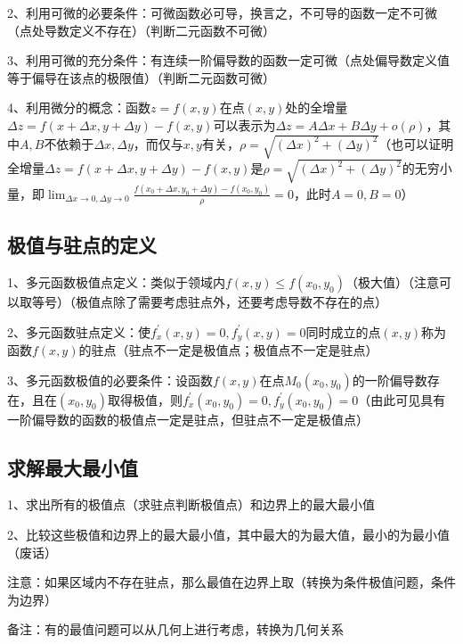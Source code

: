 2、利用可微的必要条件：可微函数必可导，换言之，不可导的函数一定不可微（点处导数定义不存在）（判断二元函数不可微）

3、利用可微的充分条件：有连续一阶偏导数的函数一定可微（点处偏导数定义值等于偏导在该点的极限值）（判断二元函数可微）

4、利用微分的概念：函数$z=f(x, y)$在点$(x, y)$处的全增量$\Delta z=f(x+\Delta x, y+\Delta y)-f(x, y)$可以表示为$\Delta z=A \Delta x+B \Delta y+o(\rho)$，其中$A,B$不依赖于$\Delta x, \Delta y$，而仅与$x, y$有关，$\rho=\sqrt{(\Delta x)^{2}+(\Delta y)^{2}}$（也可以证明全增量$\Delta z=f(x+\Delta x, y+\Delta y)-f(x, y)$是$\rho=\sqrt{(\Delta x)^{2}+(\Delta y)^{2}}$的无穷小量，即$\lim_{\Delta x \rightarrow 0,\Delta y \rightarrow 0}\frac{f\left(x_{0}+\Delta x, y_{0}+\Delta y\right)-f\left(x_{0}, y_{0}\right)}{\rho}=0$，此时$A=0,B=0$）



\subsection{极值与驻点的定义}

1、多元函数极值点定义：类似于领域内$f(x, y) \leqslant f\left(x_{0}, y_{0}\right)$（极大值）（注意可以取等号）（极值点除了需要考虑驻点外，还要考虑导数不存在的点）

2、多元函数驻点定义：使$f_{x}^{\prime}(x, y)=0, f_{y}^{\prime}(x, y)=0$同时成立的点$(x, y)$称为函数$f(x, y)$的驻点（驻点不一定是极值点；极值点不一定是驻点）

3、多元函数极值的必要条件：设函数$f(x, y)$在点$M_{0}\left(x_{0}, y_{0}\right)$的一阶偏导数存在，且在$\left(x_{0}, y_{0}\right)$取得极值，则$f_{x}^{\prime}\left(x_{0}, y_{0}\right)=0, f_{y}^{\prime}\left(x_{0}, y_{0}\right)=0$（由此可见具有一阶偏导数的函数的极值点一定是驻点，但驻点不一定是极值点）



\subsection{求解最大最小值}

1、求出所有的极值点（求驻点判断极值点）和边界上的最大最小值

2、比较这些极值和边界上的最大最小值，其中最大的为最大值，最小的为最小值（废话）

注意：如果区域内不存在驻点，那么最值在边界上取（转换为条件极值问题，条件为边界）

备注：有的最值问题可以从几何上进行考虑，转换为几何关系

